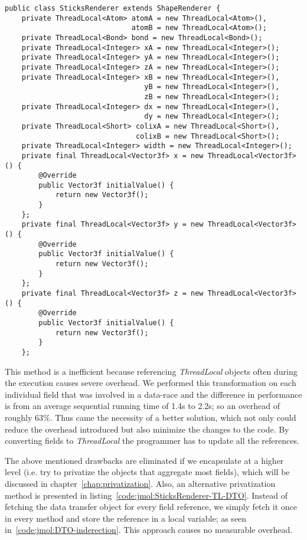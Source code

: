 \begin{lstlisting}[caption={Naive method of privatizing the data}, label =
{code:jmol:SticksRenderer-TL-naive}]
public class SticksRenderer extends ShapeRenderer {
	private ThreadLocal<Atom> atomA = new ThreadLocal<Atom>(), 
							  atomB = new ThreadLocal<Atom>();
	private ThreadLocal<Bond> bond = new ThreadLocal<Bond>();
	private ThreadLocal<Integer> xA = new ThreadLocal<Integer>();
	private ThreadLocal<Integer> yA = new ThreadLocal<Integer>();
	private ThreadLocal<Integer> zA = new ThreadLocal<Integer>();
	private ThreadLocal<Integer> xB = new ThreadLocal<Integer>(), 
								 yB = new ThreadLocal<Integer>(),
								 zB = new ThreadLocal<Integer>();
	private ThreadLocal<Integer> dx = new ThreadLocal<Integer>(),
								 dy = new ThreadLocal<Integer>();
	private ThreadLocal<Short> colixA = new ThreadLocal<Short>(),
							   colixB = new ThreadLocal<Short>();
	private ThreadLocal<Integer> width = new ThreadLocal<Integer>();
	private final ThreadLocal<Vector3f> x = new ThreadLocal<Vector3f>() {
		@Override
		public Vector3f initialValue() {
			return new Vector3f();
		}
	};
	private final ThreadLocal<Vector3f> y = new ThreadLocal<Vector3f>() {
		@Override
		public Vector3f initialValue() {
			return new Vector3f();
		}
	};
	private final ThreadLocal<Vector3f> z = new ThreadLocal<Vector3f>() {
		@Override
		public Vector3f initialValue() {
			return new Vector3f();
		}
	};
\end{lstlisting}

This method is a inefficient because referencing \emph{ThreadLocal} objects
often during the execution causes severe overhead. We performed this
transformation on each individual field that was involved in a data-race and the
difference in performance is from an average sequential running time of 1.4s to
2.2s; so an overhead of roughly 63\%. Thus came the necessity of a better
solution, which not only could reduce the overhead introduced but also minimize
the changes to the code. By converting fields to \emph{ThreadLocal} the
programmer has to update all the references.

The above mentioned drawbacks are eliminated if we encapsulate at a higher level
(i.e. try to privatize the objects that aggregate most fields), which will be
discussed in chapter~\ref{chap:privatization}. Also, an alternative
privatization method is presented in
listing~\ref{code:jmol:SticksRenderer-TL-DTO}. Instead of fetching the data
transfer object for every field reference, we simply fetch it once in every
method and store the reference in a local variable; as seen
in~\ref{code:jmol:DTO-inderection}. This approach causes no measurable overhead.

